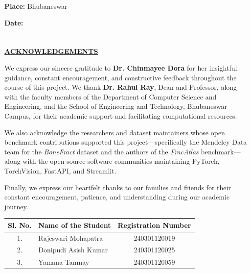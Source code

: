 \documentclass{article}
\begin{document}
\vspace{1.5cm}
\noindent \textbf{Place:} Bhubaneswar\par\vspace{0.3cm}
\noindent \textbf{Date:} 

\vfill
\newpage

\section*{}
\begin{center}
\underline{\LARGE \textbf{ACKNOWLEDGEMENTS}}\par\vspace{1.5cm}
\end{center}

\large{We express our sincere gratitude to \textbf{Dr. Chinmayee Dora} for her insightful guidance, constant encouragement, and constructive feedback throughout the course of this project. We thank \textbf{Dr. Rahul Ray}, Dean and Professor, along with the faculty members of the Department of Computer Science and Engineering, and the School of Engineering and Technology, Bhubaneswar Campus, for their academic support and facilitating computational resources.\par

We also acknowledge the researchers and dataset maintainers whose open benchmark contributions supported this project---specifically the Mendeley Data team for the \textit{BoneFract} dataset and the authors of the \textit{FracAtlas} benchmark---along with the open-source software communities maintaining PyTorch, TorchVision, FastAPI, and Streamlit.\par

Finally, we express our heartfelt thanks to our families and friends for their constant encouragement, patience, and understanding during our academic journey.}\par\vspace{1.0cm}

\begin{table}[h]
\centering
\begin{tabular}{clc}
\toprule
\textbf{Sl. No.} & \textbf{Name of the Student} & \textbf{Registration Number} \\
\midrule
1. & Rajeswari Mohapatra & 240301120019 \\
2. & Donipudi Asish Kumar & 240301120025 \\
3. & Yamana Tanmay & 240301120059 \\
\bottomrule
\end{tabular}
\end{table}
\end{document}
